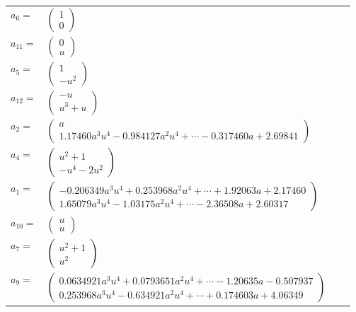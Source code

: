 \documentclass[1p]{elsarticle_modified}
\theoremstyle{definition}
\begin{document}
\begin{tabular}{m{7pt} m{180pt} m{7pt} m{180pt} }
\flushright $a_{6}=$&$\begin{pmatrix}1\\0\end{pmatrix}$ \\
\flushright $a_{11}=$&$\begin{pmatrix}0\\u\end{pmatrix}$ \\
\flushright $a_{5}=$&$\begin{pmatrix}1\\- u^2\end{pmatrix}$ \\
\flushright $a_{12}=$&$\begin{pmatrix}- u\\u^3+u\end{pmatrix}$ \\
\flushright $a_{2}=$&$\begin{pmatrix}a\\1.17460 a^{3} u^{4}-0.984127 a^{2} u^{4}+\cdots-0.317460 a+2.69841\end{pmatrix}$ \\
\flushright $a_{4}=$&$\begin{pmatrix}u^2+1\\- u^4-2 u^2\end{pmatrix}$ \\
\flushright $a_{1}=$&$\begin{pmatrix}-0.206349 a^{3} u^{4}+0.253968 a^{2} u^{4}+\cdots+1.92063 a+2.17460\\1.65079 a^{3} u^{4}-1.03175 a^{2} u^{4}+\cdots-2.36508 a+2.60317\end{pmatrix}$ \\
\flushright $a_{10}=$&$\begin{pmatrix}u\\u\end{pmatrix}$ \\
\flushright $a_{7}=$&$\begin{pmatrix}u^2+1\\u^2\end{pmatrix}$ \\
\flushright $a_{9}=$&$\begin{pmatrix}0.0634921 a^{3} u^{4}+0.0793651 a^{2} u^{4}+\cdots-1.20635 a-0.507937\\0.253968 a^{3} u^{4}-0.634921 a^{2} u^{4}+\cdots+0.174603 a+4.06349\end{pmatrix}$ \\

\end{tabular}
\end{document}
